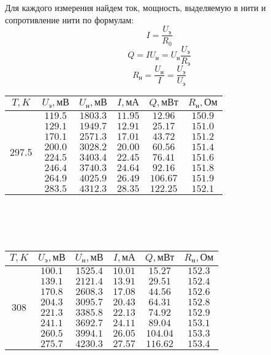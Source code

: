 \documentclass[20pt]{article}
\begin{document}
Для каждого измерения найдем ток, мощность, выделяемую в нити и сопротивление нити по формулам:
\[
	I = \frac{U_{\text{э}}}{R_0}
\]
\[
	Q = I U_{\text{н}} = U_{\text{н}} \frac{U_{\text{э}}}{R_{\text{э}}} 
\]
\[
	R_\text{н} = \frac{U_\text{н}}{I} = \frac{U_\text{э}}{U_\text{э}}
\]
\begin{tabular}{|c|c|c|c|c|c|}
\hline $T, K$ & $U_\text{э}, \text{мВ}$ & $U_{\text{н}}, \text{мВ}$ & $I, \text{мА}$ & $Q, \text{мВт}$ & $R_{\text{н}}, \text{Ом}$ \\\hline
\multirow{8}{*}{297.5}
 & $119.5$ & $1803.3$ & $11.95$ & $12.96$ & $150.9$ \\\cline{2-6}
 & $129.1$ & $1949.7$ & $12.91$ & $25.17$ & $151.0$ \\\cline{2-6}
 & $170.1$ & $2571.3$ & $17.01$ & $43.72$ & $151.2$ \\\cline{2-6}
 & $200.0$ & $3028.2$ & $20.00$ & $60.56$ & $151.4$ \\\cline{2-6}
 & $224.5$ & $3403.4$ & $22.45$ & $76.41$ & $151.6$ \\\cline{2-6}
 & $246.4$ & $3740.3$ & $24.64$ & $92.16$ & $151.8$ \\\cline{2-6}
 & $264.9$ & $4025.9$ & $26.49$ & $106.67$ & $151.9$ \\\cline{2-6}
 & $283.5$ & $4312.3$ & $28.35$ & $122.25$ & $152.1$ \\\hline
\end{tabular} \\\\\\
\begin{tabular}{|c|c|c|c|c|c|}
\hline $T, K$ & $U_\text{э}, \text{мВ}$ & $U_{\text{н}}, \text{мВ}$ & $I, \text{мА}$ & $Q, \text{мВт}$ & $R_{\text{н}}, \text{Ом}$ \\\hline
\multirow{8}{*}{308}
 & $100.1$ & $1525.4$ & $10.01$ & $15.27$ & $152.3$ \\\cline{2-6}
 & $139.1$ & $2121.4$ & $13.91$ & $29.51$ & $152.4$ \\\cline{2-6}
 & $170.8$ & $2608.3$ & $17.08$ & $44.56$ & $152.6$ \\\cline{2-6}
 & $204.3$ & $3095.7$ & $20.43$ & $64.31$ & $152.8$ \\\cline{2-6}
 & $221.3$ & $3385.8$ & $22.13$ & $74.92$ & $152.9$ \\\cline{2-6}
 & $241.1$ & $3692.7$ & $24.11$ & $89.04$ & $153.1$ \\\cline{2-6}
 & $260.5$ & $3994.1$ & $26.05$ & $104.04$ & $153.3$ \\\cline{2-6}
 & $275.7$ & $4230.3$ & $27.57$ & $116.62$ & $153.4$ \\\hline
\end{tabular} \\\\\\
\end{document}
